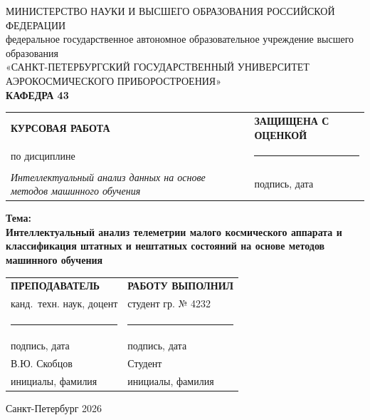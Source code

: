 \documentclass[14pt,a4paper]{extarticle}
\providecommand{\StudentName}{Студент}
\providecommand{\StudentGroup}{4232}
\providecommand{\TeacherName}{В.Ю. Скобцов}
\providecommand{\TeacherTitle}{канд.\ техн. наук, доцент}
\providecommand{\CourseTitle}{Интеллектуальный анализ данных на основе методов машинного обучения}
\providecommand{\WorkTitle}{Интеллектуальный анализ телеметрии малого космического аппарата и классификация штатных и нештатных состояний на основе методов машинного обучения}
\providecommand{\WorkYear}{2026}
\begin{document}
\begin{titlepage}
\begin{center}
МИНИСТЕРСТВО НАУКИ И ВЫСШЕГО ОБРАЗОВАНИЯ РОССИЙСКОЙ ФЕДЕРАЦИИ\\
федеральное государственное автономное образовательное учреждение высшего образования\\
«САНКТ-ПЕТЕРБУРГСКИЙ ГОСУДАРСТВЕННЫЙ УНИВЕРСИТЕТ АЭРОКОСМИЧЕСКОГО ПРИБОРОСТРОЕНИЯ»\\
\textbf{КАФЕДРА 43}
\end{center}

\vspace{1.5cm}

\noindent\begin{tabular}{p{}p{}}
\textbf{КУРСОВАЯ РАБОТА} & \textbf{ЗАЩИЩЕНА С ОЦЕНКОЙ} \\
по дисциплине & \rule{0.42\textwidth}{0.4pt} \\
\textit{\CourseTitle} & подпись, дата \\
\end{tabular}

\vspace{1.2cm}

\begin{center}
\textbf{Тема:} \\
\textbf{\WorkTitle}
\end{center}

\vfill

\noindent\begin{tabular}{p{}p{}}
\textbf{ПРЕПОДАВАТЕЛЬ} & \textbf{РАБОТУ ВЫПОЛНИЛ} \\
\TeacherTitle & студент гр. № \StudentGroup \\
\rule{0.42\textwidth}{0.4pt} & \rule{0.42\textwidth}{0.4pt} \\
подпись, дата & подпись, дата \\
\TeacherName & \StudentName \\
инициалы, фамилия & инициалы, фамилия \\
\end{tabular}

\vspace{2cm}

\begin{center}
Санкт-Петербург \WorkYear
\end{center}
\end{titlepage}

\tableofcontents
\clearpage
\listoffigures
\clearpage
\listoftables
\clearpage
\end{document}
